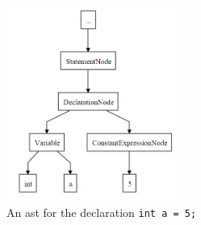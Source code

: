 \begin{figure}
\centering
\includegraphics[width=0.5\textwidth]{figures/Trees/ASTAlone.PNG}
\caption{An \acrshort{ast} for the declaration \texttt{int a = 5;}}\label{fig:ASTAlone}
\end{figure}

